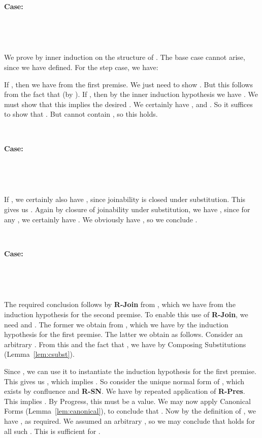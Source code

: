 \documentclass[copyright]{eptcs}
\begin{document}
\ 

\noindent \textbf{Case:}

\



\ 

\noindent We prove  by
inner induction on the structure of
.  The base case cannot arise,
since we have  defined.  For the step case, we have:

\noindent If , then we have  from the first premise.  We just need to show
.  But this follows from
the fact that  (by ).
If , then by the inner induction hypothesis we have
.  We must show that
this implies the desired .  We certainly have , and .  So it suffices to show that
.  But  cannot
contain , so this holds.

\ 

\noindent \textbf{Case:}

\



\ 

\noindent If , we certainly also have , since joinability is closed under substitution.
This gives us .  Again by
closure of joinability under substitution, we have , since for any , we
certainly have .  We
obviously have , so we conclude
.

\ 

\noindent \textbf{Case:}

\



\ 

\noindent The required conclusion follows by \textbf{R-Join} from
, which we have
from the induction hypothesis for the second premise.  To enable this
use of \textbf{R-Join}, we need  and .  The former we
obtain from ,
which we have by the induction hypothesis for the first premise.  The
latter we obtain as follows.  Consider an arbitrary
.  From this and the fact that
, we have
 by Composing Substitutions
(Lemma~\ref{lem:csubst}).  

Since , we can use it to
instantiate the induction hypothesis for the first premise.  This
gives us , which implies .  So consider the
unique normal form  of , which exists by
confluence and \textbf{R-SN}.  We have  by repeated application of \textbf{R-Pres}.
This implies .  By
Progress, this  must be a value.  We may now apply Canonical Forms
(Lemma~\ref{lem:canonical}), to conclude that .  Now
by the definition of , we have ,
as required.  We assumed an arbitrary , so
we may conclude that  holds for all such .  This is sufficient for .
\end{document}
